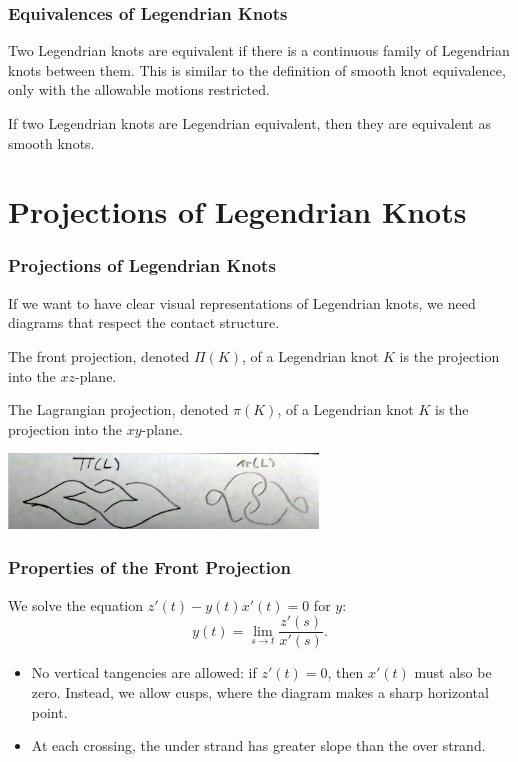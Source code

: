 \documentclass{beamer}
\begin{document}
\begin{frame}
    \frametitle{Equivalences of Legendrian Knots}
    Two Legendrian knots are equivalent if there is a continuous family of Legendrian
    knots between them. This is similar to the definition of smooth knot equivalence,
    only with the allowable motions restricted.

    \begin{theorem}
    If two Legendrian knots are Legendrian equivalent, then they are equivalent as smooth knots.
\end{theorem}



\end{frame}

\section[Proj]{Projections of Legendrian Knots}

\begin{frame}
    \frametitle{Projections of Legendrian Knots}
    If we want to have clear visual representations of Legendrian knots,
    we need diagrams that respect the contact structure.

    \begin{definition}
    The \alert{front projection}, denoted \alert{$\Pi(K)$}, of a Legendrian knot $K$ is the projection
    into the $xz$-plane.
    \end{definition}

    \begin{definition}
    The \alert{Lagrangian projection}, denoted \alert{$\pi(K)$}, of a Legendrian knot $K$ is the projection
    into the $xy$-plane.
    \end{definition}
    \includegraphics[height=2cm]{piPi.jpg}
\end{frame}

\begin{frame}
    \frametitle{Properties of the Front Projection}
    We solve the equation $z'(t) - y(t)x'(t) = 0$ for $y$:
    \[ y(t) = \lim_{s\to t} \frac{z'(s)}{x'(s)}. \]

    \begin{itemize}
    \item No vertical tangencies are allowed: if $z'(t) = 0$, then $x'(t)$ must also be zero.
    Instead, we allow \alert{cusps}, where the diagram makes a sharp horizontal point.
    \item At each crossing, the under strand has greater slope than the over strand.
    \end{itemize}
\end{frame}
\end{document}
